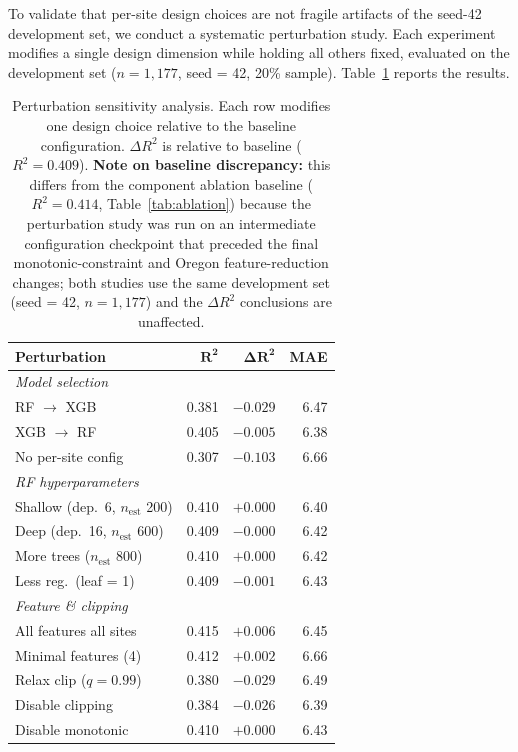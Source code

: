 \documentclass[toxins,article,submit,moreauthors]{Definitions/mdpi}
\begin{document}
To validate that per-site design choices are not fragile artifacts of the seed-42 development set, we conduct a systematic perturbation study. Each experiment modifies a single design dimension while holding all others fixed, evaluated on the development set ($n = 1{,}177$, seed = 42, 20\% sample). Table~\ref{tab:perturbation} reports the results.

\begin{table}[H]
\caption{Perturbation sensitivity analysis. Each row modifies one design choice relative to the baseline configuration. $\Delta R^2$ is relative to baseline ($R^2 = 0.409$). \textbf{Note on baseline discrepancy:} this differs from the component ablation baseline ($R^2 = 0.414$, Table~\ref{tab:ablation}) because the perturbation study was run on an intermediate configuration checkpoint that preceded the final monotonic-constraint and Oregon feature-reduction changes; both studies use the same development set (seed = 42, $n = 1{,}177$) and the $\Delta R^2$ conclusions are unaffected.}
\label{tab:perturbation}
\centering\footnotesize
\begin{tabularx}{\linewidth}{Xrrr}
\toprule
\textbf{Perturbation} & $\boldsymbol{R^2}$ & $\boldsymbol{\Delta R^2}$ & \textbf{MAE} \\
\midrule
\multicolumn{4}{l}{\textit{Model selection}} \\
\quad RF $\rightarrow$ XGB & 0.381 & $-0.029$ & 6.47 \\
\quad XGB $\rightarrow$ RF & 0.405 & $-0.005$ & 6.38 \\
\quad No per-site config   & 0.307 & $-0.103$ & 6.66 \\
\midrule
\multicolumn{4}{l}{\textit{RF hyperparameters}} \\
\quad Shallow (dep.\ 6, $n_{\text{est}}$ 200) & 0.410 & $+0.000$ & 6.40 \\
\quad Deep (dep.\ 16, $n_{\text{est}}$ 600)   & 0.409 & $-0.000$ & 6.42 \\
\quad More trees ($n_{\text{est}}$ 800)        & 0.410 & $+0.000$ & 6.42 \\
\quad Less reg.\ (leaf = 1)                    & 0.409 & $-0.001$ & 6.43 \\
\midrule
\multicolumn{4}{l}{\textit{Feature \& clipping}} \\
\quad All features all sites    & 0.415 & $+0.006$ & 6.45 \\
\quad Minimal features (4)      & 0.412 & $+0.002$ & 6.66 \\
\quad Relax clip ($q = 0.99$)   & 0.380 & $-0.029$ & 6.49 \\
\quad Disable clipping          & 0.384 & $-0.026$ & 6.39 \\
\quad Disable monotonic         & 0.410 & $+0.000$ & 6.43 \\
\bottomrule
\end{tabularx}
\end{table}
\end{document}
